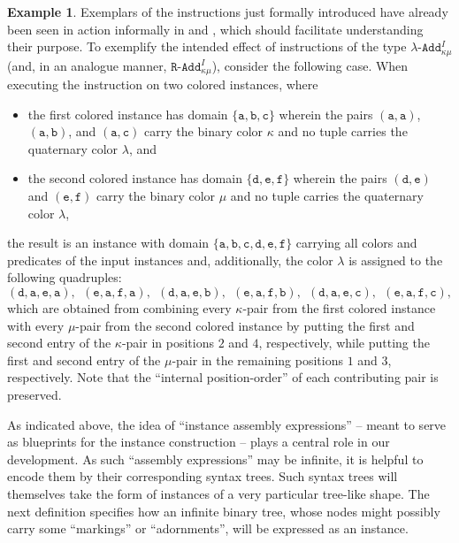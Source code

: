 \documentclass[10pt,a4paper]{amsart}
\theoremstyle{definition}
\newtheorem{exa}[exa]{Example}
\numberwithin{equation}{section}
\theoremstyle{plain}
\theoremstyle{definition}
\newtheorem{example}[example]{Example}
\theoremstyle{myexample}
\renewenvironment{example}%
{
	\begin{shaded*}	
		\vspace{-1.5ex}
		\begin{exa}%
		}{
		\end{exa}
		\vspace{-1.5ex}
	\end{shaded*}
}
\theoremstyle{plain}
\theoremstyle{definition}
\newcommand{\cadd}[4]{#4\pred{\texttt{-}Add}^{#3}_{#1#2}} %
\newcommand{\radd}[4]{#4\pred{\texttt{-}Add}^{#3}_{#1#2}}
\newcommand{\pred}[1]{\mathtt{#1}}
\newcommand{\const}[1]{\mathtt{#1}}
\newcommand{\rpred}{\pred{R}}
\begin{document}
\begin{example}
Exemplars of the instructions just formally introduced have already been seen in action informally in  and , which should facilitate understanding their purpose. To exemplify the intended effect of instructions of the type $\cadd{\kappa}{\mu}{I}{\lambda}$ (and, in an analogue manner, $\radd{\kappa}{\mu}{I}{\rpred}$), consider the following case. When executing the instruction \smash{$\cadd{\kappa}{\mu}{\{2,4\}}{\lambda}$} on two colored instances, where
\begin{itemize}
\item the first colored instance has domain $\{\const{a},\const{b},\const{c}\}$ wherein the pairs $(\const{a},\const{a})$, $(\const{a},\const{b})$, and $(\const{a},\const{c})$ carry the binary color $\kappa$ and no tuple carries the quaternary color $\lambda$, and
\item the second colored instance has domain $\{\const{d},\const{e},\const{f}\}$ wherein the pairs $(\const{d},\const{e})$ and $(\const{e},\const{f})$ carry the binary color $\mu$ and no tuple carries the quaternary color $\lambda$,  
\end{itemize}
the result is an instance with domain $\{\const{a},\const{b},\const{c},\const{d},\const{e},\const{f}\}$ carrying all colors and predicates of the input instances and, additionally, the color $\lambda$ is assigned to the following quadruples:
$$
(\const{d},\const{a},\const{e},\const{a}),\ \ 
(\const{e},\const{a},\const{f},\const{a}),\ \ 
(\const{d},\const{a},\const{e},\const{b}),\ \ 
(\const{e},\const{a},\const{f},\const{b}),\ \ 
(\const{d},\const{a},\const{e},\const{c}),\ \ 
(\const{e},\const{a},\const{f},\const{c}), 
$$%
which are obtained from combining every $\kappa$-pair from the first colored instance with every $\mu$-pair from the second colored instance by putting the first and second entry of the $\kappa$-pair in positions $2$ and $4$, respectively, while putting  the first and second entry of the $\mu$-pair in the remaining positions $1$ and $3$, respectively. Note that the ``internal position-order'' of each contributing pair is preserved.
\end{example}



As indicated above, the idea of ``instance assembly expressions'' -- meant to serve as blueprints for the instance construction -- plays a central role in our development. As such ``assembly expressions'' may be infinite, it is helpful to encode them by their corresponding syntax trees. Such syntax trees will themselves take the form of instances of a very particular tree-like shape. The next definition specifies how an infinite binary tree, whose nodes might possibly carry some ``markings'' or ``adornments'', will be expressed as an instance.      
\end{document}
